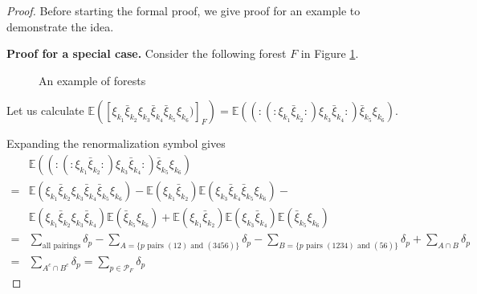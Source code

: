  \begin{proof} Before starting the formal proof, we give proof for an example to demonstrate the idea.
  
 \textbf{Proof for a special case.} Consider the following forest $F$ in Figure \ref{fig.forestexample}.
 
 \begin{figure}[H]
  \centering
  \caption{An example of forests}
  \label{fig.forestexample}
 \end{figure}
 
 Let us calculate $\mathbb{E}([\xi_{k_1}\bar{\xi}_{k_2}\xi_{k_3}\bar{\xi}_{k_4}\bar{\xi}_{k_5}\xi_{k_6})]_{F})=\mathbb{E}((:(:\xi_{k_1}\bar{\xi}_{k_2}:)\xi_{k_3}\bar{\xi}_{k_4}:)\bar{\xi}_{k_5}\xi_{k_6})$.
 
 Expanding the renormalization symbol gives
 \begin{equation}
  \begin{split}
  &\mathbb{E}((:(:\xi_{k_1}\bar{\xi}_{k_2}:)\xi_{k_3}\bar{\xi}_{k_4}:)\bar{\xi}_{k_5}\xi_{k_6})
  \\
  =&\mathbb{E}(\xi_{k_1}\bar{\xi}_{k_2}\xi_{k_3}\bar{\xi}_{k_4}\bar{\xi}_{k_5}\xi_{k_6})-\mathbb{E}(\xi_{k_1}\bar{\xi}_{k_2})\mathbb{E}( \xi_{k_3}\bar{\xi}_{k_4}\bar{\xi}_{k_5}\xi_{k_6})-
  \\
  &\mathbb{E}(\xi_{k_1}\bar{\xi}_{k_2}\xi_{k_3}\bar{\xi}_{k_4})\mathbb{E}( \bar{\xi}_{k_5}\xi_{k_6}) + \mathbb{E}(\xi_{k_1}\bar{\xi}_{k_2})\mathbb{E}(\xi_{k_3}\bar{\xi}_{k_4})\mathbb{E}( \bar{\xi}_{k_5}\xi_{k_6})
  \\
  =&\sum_{\text{all pairings}} \delta_p - \sum_{A=\{p \text{ pairs } (12)\text{ and }(3456)\}} \delta_p-\sum_{B = \{p \text{ pairs } (1234)\text{ and }(56)\}} \delta_p+\sum_{A\cap B} \delta_p
  \\
  = & \sum_{A^c\cap B^c} \delta_p = \sum_{p\in \mathcal{P}_F} \delta_p
  \end{split}
 \end{equation}
 

\end{proof}

